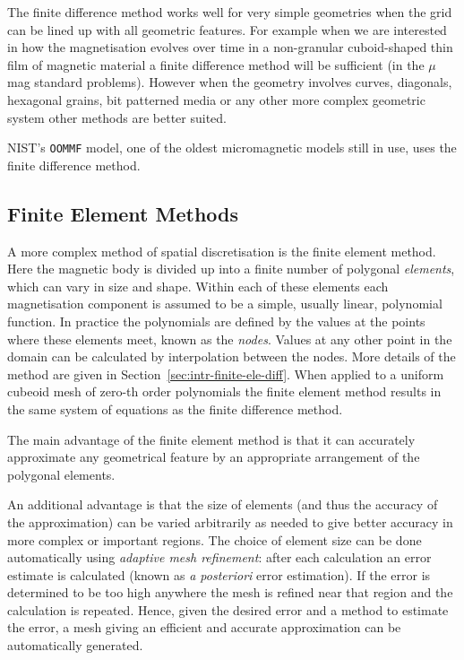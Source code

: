 The finite difference method works well for very simple geometries when the grid can be lined up with all geometric features. 
For example when we are interested in how the magnetisation evolves over time in a non-granular cuboid-shaped thin film of magnetic material a finite difference method will be sufficient (\eg in the $\mu$mag standard problems\cite{mumag-website}). 
However when the geometry involves curves, diagonals, hexagonal grains, bit patterned media or any other more complex geometric system other methods are better suited.

NIST's \texttt{OOMMF} model, one of the oldest micromagnetic models still in use, uses the finite difference method\cite{oommf-website}.


\subsection{Finite Element Methods}
\label{sec:sd-finite-elem-meth}

A more complex method of spatial discretisation is the finite element method\cite{HowardElmanDavidSilvester2006}.
Here the magnetic body is divided up into a finite number of polygonal \emph{elements}, which can vary in size and shape.
Within each of these elements each magnetisation component is assumed to be a simple, usually linear, polynomial function.
In practice the polynomials are defined by the values at the points where these elements meet, known as the \emph{nodes}.
Values at any other point in the domain can be calculated by interpolation between the nodes. More details of the method are given in Section~\ref{sec:intr-finite-ele-diff}.
When applied to a uniform cubeoid mesh of zero-th order polynomials the finite element method results in the same system of equations as the finite difference method\cite{??ds}.

The main advantage of the finite element method is that it can accurately approximate any geometrical feature by an appropriate arrangement of the polygonal elements.

An additional advantage is that the size of elements (and thus the accuracy of the approximation) can be varied arbitrarily as needed to give better accuracy in more complex or important regions. 
The choice of element size can be done automatically using \emph{adaptive mesh refinement}: after each calculation an error estimate is calculated (known as \emph{a posteriori} error estimation).
If the error is determined to be too high anywhere the mesh is refined near that region and the calculation is repeated.
Hence, given the desired error and a method to estimate the error, a mesh giving an efficient and accurate approximation can be automatically generated.\cite{Schrefl1999}

